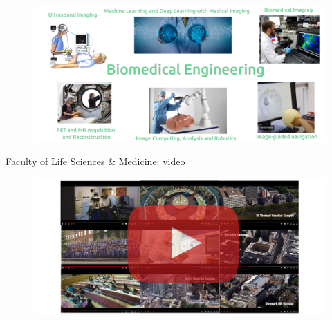 %
%



{
\begin{frame}{}

  \begin{figure}
  \centering
  \includegraphics[width=1.0\textwidth]{./../figures/biomedical-engineer/versions/drawing-v04}
  \end{figure}

\end{frame}
}



{
\begin{frame}{Faculty of Life Sciences \& Medicine: video}

  \begin{figure}
  \centering
  \includegraphics[width=1.0\textwidth]{./../figures/videos-life-science-and-medicine/versions/drawing-v00}
  \end{figure}

\end{frame}
}

